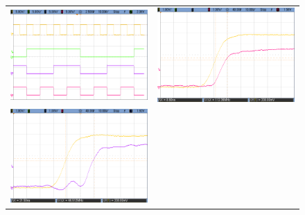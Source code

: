 \begin{figure}[H]
    \centering
        \begin{tabular}{c c}
            \includegraphics[scale=0.2]{../EJ7/Mediciones/Osciloscopio/Segundo_Intento/Asincronico/cropped_contador.png} &
            \includegraphics[scale=0.2]{../EJ7/Mediciones/Osciloscopio/Segundo_Intento/Asincronico/cropped_salida_q0.png} \\
            \includegraphics[scale=0.2]{../EJ7/Mediciones/Osciloscopio/Segundo_Intento/Asincronico/cropped_salida_q1.png} &

\end{tabular}
\end{figure}
